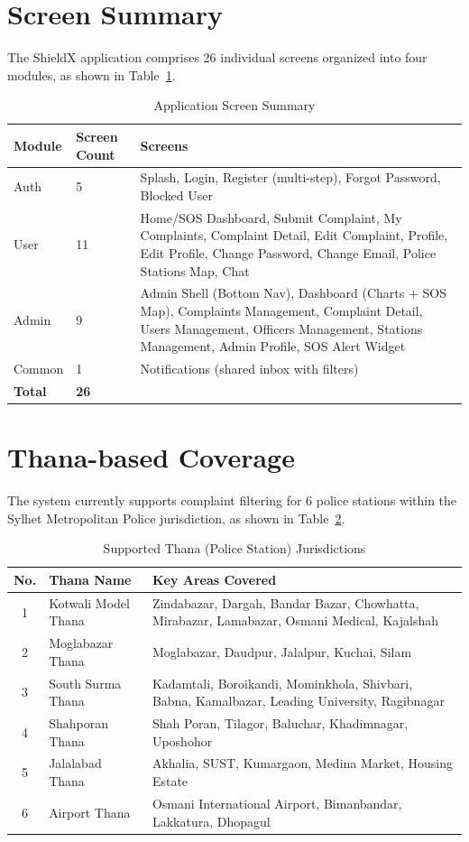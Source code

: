 \documentclass[11pt, a4paper]{report}
\begin{document}
\section{Screen Summary}
The ShieldX application comprises 26 individual screens organized into four modules, as shown in Table~\ref{tab:screens}.

\begin{table}[ht]
\centering
\caption{Application Screen Summary}
\label{tab:screens}
\begin{tabularx}{\textwidth}{llX}
\toprule
\textbf{Module} & \textbf{Screen Count} & \textbf{Screens} \\
\midrule
Auth & 5 & Splash, Login, Register (multi-step), Forgot Password, Blocked User \\
\addlinespace
User & 11 & Home/SOS Dashboard, Submit Complaint, My Complaints, Complaint Detail, Edit Complaint, Profile, Edit Profile, Change Password, Change Email, Police Stations Map, Chat \\
\addlinespace
Admin & 9 & Admin Shell (Bottom Nav), Dashboard (Charts + SOS Map), Complaints Management, Complaint Detail, Users Management, Officers Management, Stations Management, Admin Profile, SOS Alert Widget \\
\addlinespace
Common & 1 & Notifications (shared inbox with filters) \\
\midrule
\textbf{Total} & \textbf{26} & \\
\bottomrule
\end{tabularx}
\end{table}

\section{Thana-based Coverage}
The system currently supports complaint filtering for 6 police stations within the Sylhet Metropolitan Police jurisdiction, as shown in Table~\ref{tab:thanas}.

\begin{table}[ht]
\centering
\caption{Supported Thana (Police Station) Jurisdictions}
\label{tab:thanas}
\begin{tabularx}{\textwidth}{clX}
\toprule
\textbf{No.} & \textbf{Thana Name} & \textbf{Key Areas Covered} \\
\midrule
1 & Kotwali Model Thana & Zindabazar, Dargah, Bandar Bazar, Chowhatta, Mirabazar, Lamabazar, Osmani Medical, Kajalshah \\
2 & Moglabazar Thana & Moglabazar, Daudpur, Jalalpur, Kuchai, Silam \\
3 & South Surma Thana & Kadamtali, Boroikandi, Mominkhola, Shivbari, Babna, Kamalbazar, Leading University, Ragibnagar \\
4 & Shahporan Thana & Shah Poran, Tilagor, Baluchar, Khadimnagar, Uposhohor \\
5 & Jalalabad Thana & Akhalia, SUST, Kumargaon, Medina Market, Housing Estate \\
6 & Airport Thana & Osmani International Airport, Bimanbandar, Lakkatura, Dhopagul \\
\bottomrule
\end{tabularx}
\end{table}
\end{document}
